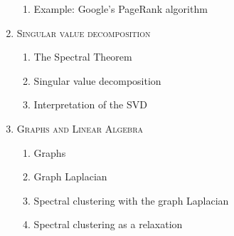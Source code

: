 \begin{enumerate}[label=\textbf{\arabic*.}]
\begin{enumerate}[label=\arabic*.]
\item Example: Google's PageRank algorithm
\end{enumerate}
\item \textsc{Singular value decomposition}
\begin{enumerate}[label=\arabic*.]
\item The Spectral Theorem
\item Singular value decomposition
\item Interpretation of the SVD
\end{enumerate}
\item \textsc{Graphs and Linear Algebra}
\begin{enumerate}[label=\arabic*.]
\item Graphs
\item Graph Laplacian
\item Spectral clustering with the graph Laplacian
\item Spectral clustering as a relaxation
\end{enumerate}
\end{enumerate}
